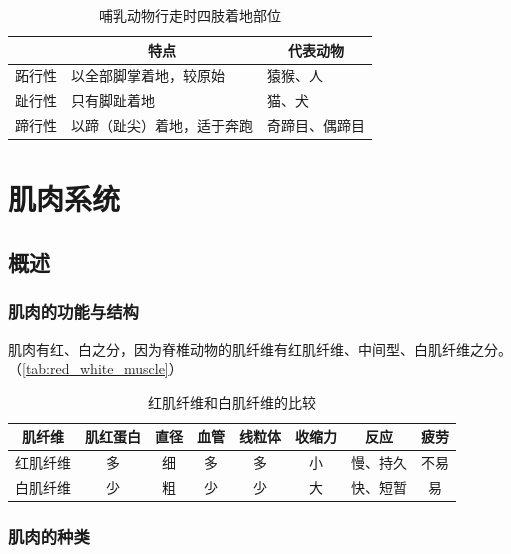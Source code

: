 \begin{table}[h]
	\centering
	\begin{tabularx}{\textwidth}{|>{\centering\arraybackslash}m{6em}|X|X|}
		\hline
		\multicolumn{1}{|c|}{\textbf{四肢着地方式}} & \multicolumn{1}{c|}{\textbf{特点}} & \multicolumn{1}{c|}{\textbf{代表动物}} \\ \hline
		跖行性 & 以全部脚掌着地，较原始 & 猿猴、人 \\ \hline
		趾行性 & 只有脚趾着地 & 猫、犬 \\ \hline
		蹄行性 & 以蹄（趾尖）着地，适于奔跑 & 奇蹄目、偶蹄目 \\ \hline
	\end{tabularx}
	\caption{哺乳动物行走时四肢着地部位}
	\label{tab:mammal_walk}
\end{table}







\section{肌肉系统}


\subsection{概述}

\subsubsection{肌肉的功能与结构}

肌肉有红、白之分，因为脊椎动物的肌纤维有红肌纤维、中间型、白肌纤维之分。（\autoref{tab:red_white_muscle}）

\begin{table}[htbp]
	\centering
	\begin{tabularx}{\textwidth}{|C|C|c|c|c|c|C|c|}
		\hline
		\textbf{肌纤维} & \textbf{肌红蛋白} & \textbf{直径} & \textbf{血管} & \textbf{线粒体} & \textbf{收缩力} & \textbf{反应} & \textbf{疲劳} \\ \hline
		红肌纤维 & 多 & 细 & 多 & 多 & 小 & 慢、持久 & 不易 \\ \hline
		白肌纤维 & 少 & 粗 & 少 & 少 & 大 & 快、短暂 & 易 \\ \hline
	\end{tabularx}
	\caption{红肌纤维和白肌纤维的比较}
	\label{tab:red_white_muscle}
\end{table}

\subsubsection{肌肉的种类}


